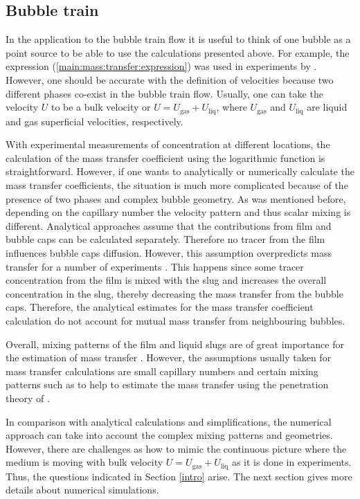 \documentclass[preprint,12pt]{elsarticle}
\newcommand{\uliq}{U_{\mathrm{liq}}}
\newcommand{\ugas}{U_{\mathrm{gas}}}
\begin{document}
\subsection{Bubble train}
In the application to the bubble train flow it is useful to think of one bubble as a point
source to be able to use the calculations presented above. For example, the expression
(\ref{main:mass:transfer:expression}) was used in experiments by
\citet{bercic-mass}. However, one should be accurate with the definition of velocities because two
different phases co-exist in the bubble train flow. Usually, one can take the velocity $U$ to be
a bulk velocity or $U=\ugas+\uliq$, where $\ugas$ and $\uliq$ are liquid and gas
superficial velocities, respectively. 

With experimental measurements of concentration at different locations, the calculation
of the mass transfer coefficient using the logarithmic function is straightforward.
However, if one wants to analytically or numerically calculate the mass transfer coefficients, the
situation is much more complicated because of the presence of two phases and complex bubble
geometry. As was mentioned before, depending on the capillary
number the velocity pattern and thus scalar mixing is different. Analytical approaches
\cite{irandoust,vanbaten-circular} assume that the
contributions from film and bubble caps can be calculated separately. Therefore no tracer from the film influences bubble caps diffusion.   However, this assumption overpredicts mass transfer for a number of experiments \cite{irandoust}. This happens since some tracer
concentration from the film is mixed with the slug and increases the overall concentration in the slug, thereby decreasing
the mass transfer from the bubble caps.
Therefore, the analytical estimates for the mass transfer coefficient calculation  do not account for mutual mass
transfer from neighbouring bubbles.

Overall, mixing patterns of the film and liquid slugs are of great importance for the 
estimation of mass transfer \cite{yue-mass}. However, the assumptions usually taken for 
mass transfer calculations are small capillary numbers and certain mixing patterns such as to help to
estimate the mass transfer using the penetration theory of \citet{higbie}.

In comparison with analytical calculations and simplifications, the numerical approach can take into
account the complex mixing patterns and geometries. However, there are challenges as  how to
mimic the continuous picture where the medium is moving with bulk velocity $U=\ugas+\uliq$  as it is done in
experiments. Thus, the questions indicated in Section \ref{intro} arise.  The next section gives more
 details about numerical simulations.
 
\end{document}
